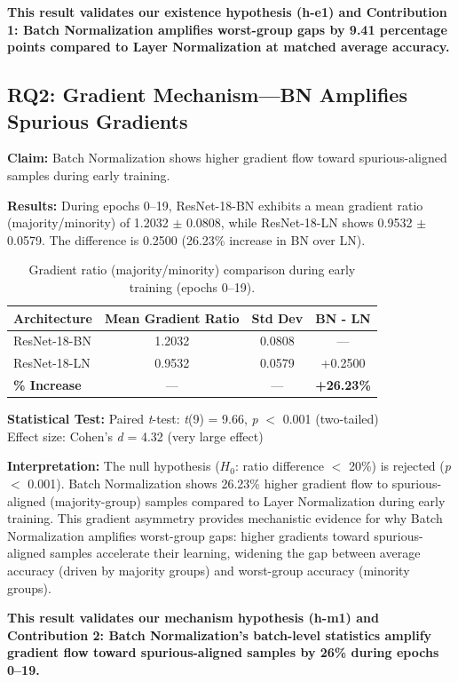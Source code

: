 \textbf{This result validates our existence hypothesis (h-e1) and Contribution 1: Batch Normalization amplifies worst-group gaps by 9.41 percentage points compared to Layer Normalization at matched average accuracy.}

\subsection{RQ2: Gradient Mechanism---BN Amplifies Spurious Gradients}

\textbf{Claim:} Batch Normalization shows higher gradient flow toward spurious-aligned samples during early training.

\textbf{Results:} During epochs 0--19, ResNet-18-BN exhibits a mean gradient ratio (majority/minority) of 1.2032 $\pm$ 0.0808, while ResNet-18-LN shows 0.9532 $\pm$ 0.0579. The difference is 0.2500 (26.23\% increase in BN over LN).

\begin{table}[h]
\centering
\caption{Gradient ratio (majority/minority) comparison during early training (epochs 0--19).}
\label{tab:rq2_gradients}
\begin{tabular}{lccc}
\toprule
Architecture & Mean Gradient Ratio & Std Dev & BN - LN \\
\midrule
ResNet-18-BN & 1.2032 & 0.0808 & --- \\
ResNet-18-LN & 0.9532 & 0.0579 & +0.2500 \\
\textbf{\% Increase} & --- & --- & \textbf{+26.23\%} \\
\bottomrule
\end{tabular}
\end{table}

\textbf{Statistical Test:}
Paired \emph{t}-test: \emph{t}(9) = 9.66, \emph{p} $<$ 0.001 (two-tailed) \\
Effect size: Cohen's \emph{d} = 4.32 (very large effect)

\textbf{Interpretation:} The null hypothesis ($H_0$: ratio difference $<$ 20\%) is rejected (\emph{p} $<$ 0.001). Batch Normalization shows 26.23\% higher gradient flow to spurious-aligned (majority-group) samples compared to Layer Normalization during early training. This gradient asymmetry provides mechanistic evidence for why Batch Normalization amplifies worst-group gaps: higher gradients toward spurious-aligned samples accelerate their learning, widening the gap between average accuracy (driven by majority groups) and worst-group accuracy (minority groups).

\textbf{This result validates our mechanism hypothesis (h-m1) and Contribution 2: Batch Normalization's batch-level statistics amplify gradient flow toward spurious-aligned samples by 26\% during epochs 0--19.}

